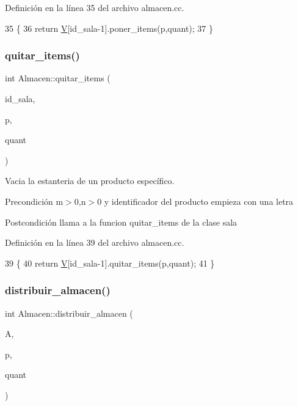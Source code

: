 Definición en la línea 35 del archivo almacen.\+cc.


\begin{DoxyCode}
35                                                            \{
36   \textcolor{keywordflow}{return} \mbox{\hyperlink{class_almacen_a76cad3a8f2f670e26d7ceb827f7f9e69}{V}}[id\_sala-1].poner\_items(p,quant);
37 \}
\end{DoxyCode}
\mbox{\label{class_almacen_a9352bd3ee6b624a02283c627d27aec3e}} 
\subsubsection{\texorpdfstring{quitar\+\_\+items()}{quitar\_items()}}
{\footnotesize\ttfamily int Almacen\+::quitar\+\_\+items (\begin{DoxyParamCaption}\item[{int}]{id\+\_\+sala,  }\item[{std\+::string}]{p,  }\item[{int}]{quant }\end{DoxyParamCaption})}



Vacia la estanteria de un producto específico. 

\begin{DoxyPrecond}{Precondición}
m$>$0,n$>$0 y identificador del producto empieza con una letra 
\end{DoxyPrecond}
\begin{DoxyPostcond}{Postcondición}
llama a la funcion quitar\+\_\+items de la clase sala 
\end{DoxyPostcond}


Definición en la línea 39 del archivo almacen.\+cc.


\begin{DoxyCode}
39                                                             \{
40   \textcolor{keywordflow}{return} \mbox{\hyperlink{class_almacen_a76cad3a8f2f670e26d7ceb827f7f9e69}{V}}[id\_sala-1].quitar\_items(p,quant);
41 \}
\end{DoxyCode}
\mbox{\label{class_almacen_a2535172748b53c612e9347da5fd3bec6}} 
\subsubsection{\texorpdfstring{distribuir\+\_\+almacen()}{distribuir\_almacen()}}
{\footnotesize\ttfamily int Almacen\+::distribuir\+\_\+almacen (\begin{DoxyParamCaption}\item[{\mbox{\hyperlink{class_bin_tree}{Bin\+Tree}}$<$ int $>$}]{A,  }\item[{std\+::string \&}]{p,  }\item[{int}]{quant }\end{DoxyParamCaption})}



